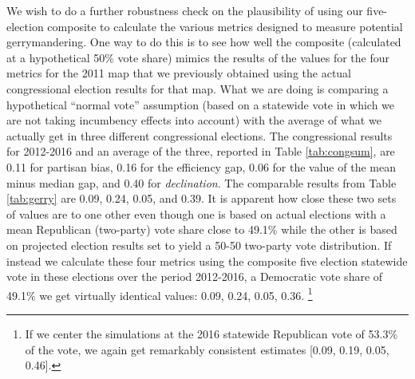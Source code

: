      We wish to do a further robustness check on the plausibility of using our five-election composite to calculate the various metrics designed to measure potential gerrymandering. One way to do this is to see how well the composite (calculated at a hypothetical 50\% vote share) mimics the results of the values for the four metrics for the 2011 map that we previously obtained using the actual congressional election results for that map. What we are doing is comparing a hypothetical ``normal vote” \citep{Converse1966} assumption (based on a statewide vote in which we are not taking incumbency effects into account) with the average of what we actually get in three different congressional elections. The congressional results for 2012-2016 and an average of the three, reported in Table \ref{tab:congsum}, are 0.11 for partisan bias, 0.16 for the efficiency gap, 0.06 for the value of the mean minus median gap, and 0.40 for \textit{declination}. The comparable results from Table \ref{tab:gerry} are 0.09, 0.24, 0.05, and 0.39. It is apparent how close these two sets of values are to one other even though one is based on actual elections with a mean Republican (two-party) vote share close to 49.1\% while the other is based on projected election results set to yield a 50-50 two-party vote distribution. If instead we calculate these four metrics using the composite five election statewide vote in these elections over the period 2012-2016, a Democratic vote share of 49.1\% we get virtually identical values: 0.09, 0.24, 0.05, 0.36.
		\footnote{If we center the simulations at the 2016 statewide Republican vote of 53.3\% of the vote, we again get remarkably consistent estimates [0.09, 0.19, 0.05, 0.46].}
\par
